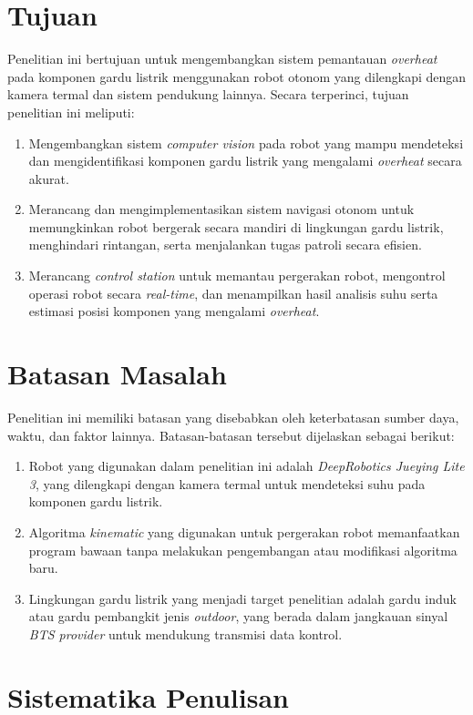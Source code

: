 \section{Tujuan}
Penelitian ini bertujuan untuk mengembangkan sistem pemantauan \emph{overheat} pada komponen gardu listrik menggunakan robot otonom yang dilengkapi dengan kamera termal dan sistem pendukung lainnya. Secara terperinci, tujuan penelitian ini meliputi:
\begin{enumerate}
    \item Mengembangkan sistem \emph{computer vision} pada robot yang mampu mendeteksi dan mengidentifikasi komponen gardu listrik yang mengalami \emph{overheat} secara akurat.
    \item Merancang dan mengimplementasikan sistem navigasi otonom untuk memungkinkan robot bergerak secara mandiri di lingkungan gardu listrik, menghindari rintangan, serta menjalankan tugas patroli secara efisien.
    \item Merancang \emph{control station} untuk memantau pergerakan robot, mengontrol operasi robot secara \emph{real-time}, dan menampilkan hasil analisis suhu serta estimasi posisi komponen yang mengalami \emph{overheat}.
\end{enumerate}

\section{Batasan Masalah}
Penelitian ini memiliki batasan yang disebabkan oleh keterbatasan sumber daya, waktu, dan faktor lainnya. Batasan-batasan tersebut dijelaskan sebagai berikut:
\begin{enumerate}
    \item Robot yang digunakan dalam penelitian ini adalah \emph{DeepRobotics Jueying Lite 3}, yang dilengkapi dengan kamera termal untuk mendeteksi suhu pada komponen gardu listrik.
    \item Algoritma \emph{kinematic} yang digunakan untuk pergerakan robot memanfaatkan program bawaan tanpa melakukan pengembangan atau modifikasi algoritma baru.
    \item Lingkungan gardu listrik yang menjadi target penelitian adalah gardu induk atau gardu pembangkit jenis \emph{outdoor}, yang berada dalam jangkauan sinyal \emph{BTS provider} untuk mendukung transmisi data kontrol.
\end{enumerate}

\section{Sistematika Penulisan}
\label{sec:sistematikapenulisan}

